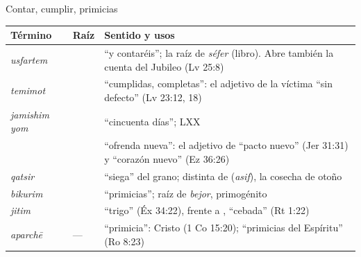 \begin{frame}{Contar, cumplir, primicias}
\scriptsize\renewcommand{\arraystretch}{1.15}
\begin{tabular}{@{}L{2.9cm}L{1.1cm}L{7.8cm}@{}}
\toprule
\textbf{Término} & \textbf{Raíz} & \textbf{Sentido y usos} \\ \midrule
{} \emph{usfartem} &  & ``y contaréis''; la raíz de \emph{séfer} (libro). Abre también la cuenta del Jubileo (Lv 25:8) \\
 \emph{temimot} &  & ``cumplidas, completas'': el adjetivo de la víctima ``sin defecto'' (Lv 23:12, 18) \\
 \emph{jamishim yom} &  & ``cincuenta días''; LXX  \\
 &  & ``ofrenda nueva'': el adjetivo de ``pacto nuevo'' (Jer 31:31) y ``corazón nuevo'' (Ez 36:26) \\
 \emph{qatsir} &  & ``siega'' del grano; distinta de  (\emph{asif}), la cosecha de otoño \\
 \emph{bikurim} &  & ``primicias''; raíz de \emph{bejor}, primogénito \\
 \emph{jitim} &  & ``trigo'' (Éx 34:22), frente a , ``cebada'' (Rt 1:22) \\
 \emph{aparchē} & --- & ``primicia'': Cristo (1 Co 15:20); ``primicias del Espíritu'' (Ro 8:23) \\
\bottomrule
\end{tabular}
\end{frame}

